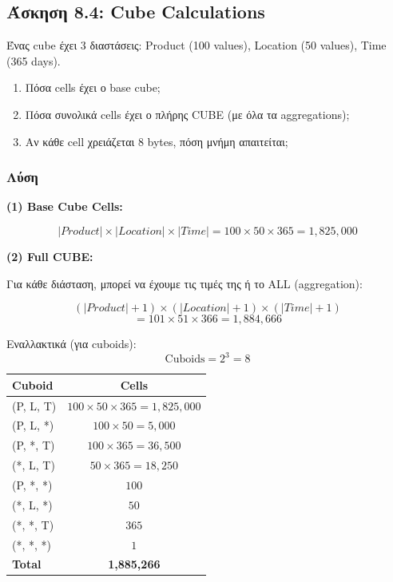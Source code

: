 \subsection{Άσκηση 8.4: Cube Calculations}

\begin{formulabox}[Εκφώνηση]
Ένας cube έχει 3 διαστάσεις: Product (100 values), Location (50 values),
Time (365 days).

\begin{enumerate}
    \item Πόσα cells έχει ο base cube;
    \item Πόσα συνολικά cells έχει ο πλήρης CUBE (με όλα τα aggregations);
    \item Αν κάθε cell χρειάζεται 8 bytes, πόση μνήμη απαιτείται;
\end{enumerate}
\end{formulabox}

\subsubsection*{Λύση}

\textbf{(1) Base Cube Cells:}

$$|Product| \times |Location| \times |Time| = 100 \times 50 \times 365 = 1,825,000$$

\textbf{(2) Full CUBE:}

Για κάθε διάσταση, μπορεί να έχουμε τις τιμές της ή το ALL (aggregation):

$$(|Product| + 1) \times (|Location| + 1) \times (|Time| + 1)$$
$$= 101 \times 51 \times 366 = 1,884,666$$

Εναλλακτικά (για cuboids):
$$\text{Cuboids} = 2^3 = 8$$

\begin{center}
\begin{tabular}{lc}
\toprule
\textbf{Cuboid} & \textbf{Cells} \\
\midrule
(P, L, T) & $100 \times 50 \times 365 = 1,825,000$ \\
(P, L, *) & $100 \times 50 = 5,000$ \\
(P, *, T) & $100 \times 365 = 36,500$ \\
(*, L, T) & $50 \times 365 = 18,250$ \\
(P, *, *) & $100$ \\
(*, L, *) & $50$ \\
(*, *, T) & $365$ \\
(*, *, *) & $1$ \\
\midrule
\textbf{Total} & \textbf{1,885,266} \\
\bottomrule
\end{tabular}
\end{center}

